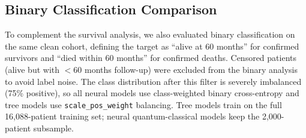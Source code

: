 \documentclass[12pt, letterpaper]{article}
\begin{document}
\subsection{Binary Classification Comparison}

To complement the survival analysis, we also evaluated binary classification on the same clean cohort, defining the target as ``alive at 60 months'' for confirmed survivors and ``died within 60 months'' for confirmed deaths. Censored patients (alive but with $<60$ months follow-up) were excluded from the binary analysis to avoid label noise. The class distribution after this filter is severely imbalanced (75\% positive), so all neural models use class-weighted binary cross-entropy and tree models use \texttt{scale\_pos\_weight} balancing. Tree models train on the full 16{,}088-patient training set; neural quantum-classical models keep the 2{,}000-patient subsample.
\end{document}
